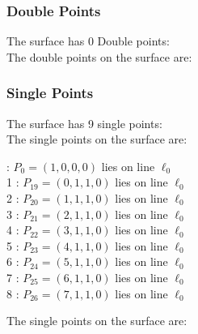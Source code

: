 \documentclass{article}
\begin{document}
{\subsubsection*{Double Points}
The surface has 0 Double points:\\
The double points on the surface are:\\
\begin{multicols}{2}
\noindent
\end{multicols}
\subsubsection*{Single Points}
The surface has 9 single points:\\
The single points on the surface are:\\
\begin{multicols}{2}
 : $P_{0}=( 1, 0, 0, 0 )$ lies on line $\ell_{0}$\\
1 : $P_{19}=( 0, 1, 1, 0 )$ lies on line $\ell_{0}$\\
2 : $P_{20}=( 1, 1, 1, 0 )$ lies on line $\ell_{0}$\\
3 : $P_{21}=( 2, 1, 1, 0 )$ lies on line $\ell_{0}$\\
4 : $P_{22}=( 3, 1, 1, 0 )$ lies on line $\ell_{0}$\\
5 : $P_{23}=( 4, 1, 1, 0 )$ lies on line $\ell_{0}$\\
6 : $P_{24}=( 5, 1, 1, 0 )$ lies on line $\ell_{0}$\\
7 : $P_{25}=( 6, 1, 1, 0 )$ lies on line $\ell_{0}$\\
8 : $P_{26}=( 7, 1, 1, 0 )$ lies on line $\ell_{0}$\\
\end{multicols}
The single points on the surface are:\\
}
\end{document}
